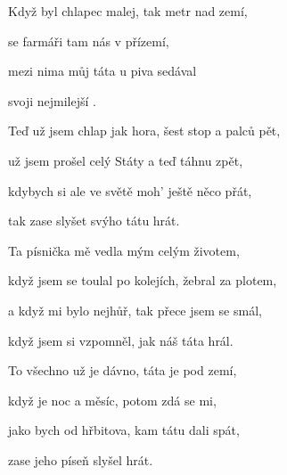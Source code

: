 

\zs
Když  byl chlapec malej, tak metr nad zemí,

 se farmáři tam  nás v přízemí,

mezi nima můj táta u piva sedával

 svoji nejmilejší .
\ks

\zs
Teď už jsem chlap jak hora, šest stop a palců pět,

už jsem prošel celý Státy a teď táhnu zpět,

kdybych si ale ve světě moh' ještě něco přát,

tak zase slyšet svýho tátu hrát.
\ks

\zs
Ta písnička mě vedla mým celým životem,

když jsem se toulal po kolejích, žebral za plotem,

a když mi bylo nejhůř, tak přece jsem se smál,

když jsem si vzpomněl, jak náš táta hrál.
\ks

\zs
To všechno už je dávno, táta je pod zemí,

když je noc a měsíc, potom zdá se mi,

jako bych od hřbitova, kam tátu dali spát,

zase jeho píseň slyšel hrát.
\ks

\kp







